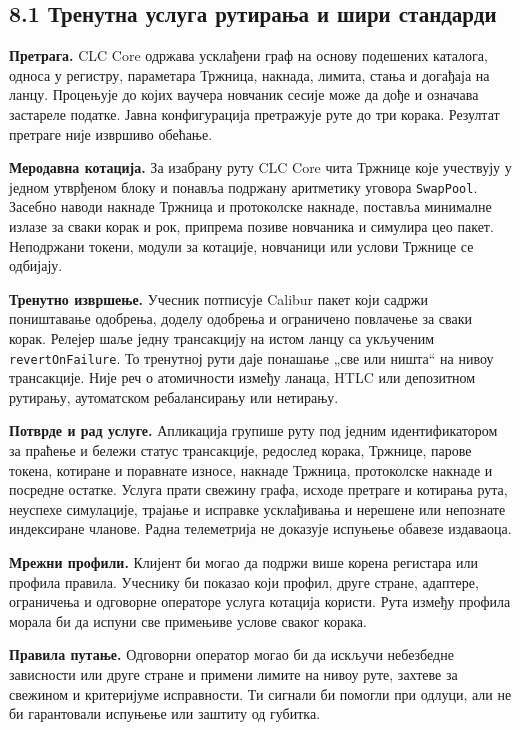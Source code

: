 \documentclass[11pt]{article}
\begin{document}
\subsection*{8.1 Тренутна услуга рутирања и шири стандарди}

\textbf{Претрага.} CLC Core одржава усклађени граф на основу подешених каталога, односа у регистру, параметара Тржница, накнада, лимита, стања и догађаја на ланцу. Процењује до којих ваучера новчаник сесије може да дође и означава застареле податке. Јавна конфигурација претражује руте до три корака. Резултат претраге није извршиво обећање.

\textbf{Меродавна котација.} За изабрану руту CLC Core чита Тржнице које учествују у једном утврђеном блоку и понавља подржану аритметику уговора \texttt{SwapPool}. Засебно наводи накнаде Тржница и протоколске накнаде, поставља минималне излазе за сваки корак и рок, припрема позиве новчаника и симулира цео пакет. Неподржани токени, модули за котације, новчаници или услови Тржнице се одбијају.

\textbf{Тренутно извршење.} Учесник потписује Calibur пакет који садржи поништавање одобрења, доделу одобрења и ограничено повлачење за сваки корак. Релејер шаље једну трансакцију на истом ланцу са укљученим \texttt{revertOnFailure}. То тренутној рути даје понашање „све или ништа`` на нивоу трансакције. Није реч о атомичности између ланаца, HTLC или депозитном рутирању, аутоматском ребалансирању или нетирању.

\textbf{Потврде и рад услуге.} Апликација групише руту под једним идентификатором за праћење и бележи статус трансакције, редослед корака, Тржнице, парове токена, котиране и поравнате износе, накнаде Тржница, протоколске накнаде и посредне остатке. Услуга прати свежину графа, исходе претраге и котирања рута, неуспехе симулације, трајање и исправке усклађивања и нерешене или непознате индексиране чланове. Радна телеметрија не доказује испуњење обавезе издаваоца.

\textbf{Мрежни профили.} Клијент би могао да подржи више корена регистара или профила правила. Учеснику би показао који профил, друге стране, адаптере, ограничења и одговорне операторе услуга котација користи. Рута између профила морала би да испуни све примењиве услове сваког корака.

\textbf{Правила путање.} Одговорни оператор могао би да искључи небезбедне зависности или друге стране и примени лимите на нивоу руте, захтеве за свежином и критеријуме исправности. Ти сигнали би помогли при одлуци, али не би гарантовали испуњење или заштиту од губитка.
\end{document}
